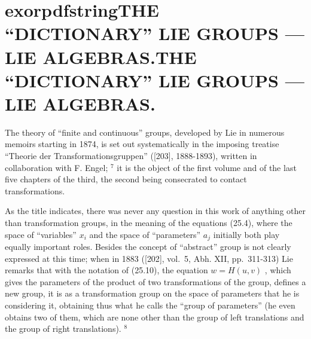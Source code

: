 \section{	exorpdfstring{THE ``DICTIONARY'' LIE GROUPS --- LIE ALGEBRAS.}{THE “DICTIONARY” LIE GROUPS — LIE ALGEBRAS.}}

The theory of ``finite and continuous'' groups, developed by Lie in numerous memoirs starting in 1874, is set out systematically in the imposing treatise ``Theorie der Transformationsgruppen'' ({[}203{]}, 1888-1893), written in collaboration with F. Engel; \(^{7}\) it is the object of the first volume and of the last five chapters of the third, the second being consecrated to contact transformations.

As the title indicates, there was never any question in this work of anything other than transformation groups, in the meaning of the equations (25.4), where the space of ``variables'' \(x_{i}\) and the space of ``parameters'' \(a_{j}\) initially both play equally important roles. Besides the concept of ``abstract'' group is not clearly expressed at this time; when in 1883 ({[}202{]}, vol.~5, Abh. XII, pp.~311-313) Lie remarks that with the notation of (25.10), the equation \(w = H(u, v)\) , which gives the parameters of the product of two transformations of the group, defines a new group, it is as a transformation group on the space of parameters that he is considering it, obtaining thus what he calls the ``group of parameters'' (he even obtains two of them, which are none other than the group of left translations and the group of right translations). \(^{8}\)

